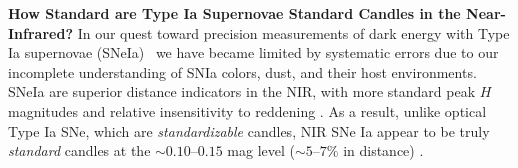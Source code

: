 \documentclass[11pt]{article}
\begin{document}
%

%
%
%

\sciencejustification
{\bf How Standard are Type Ia Supernovae Standard Candles in the Near-Infrared?} 
In our quest toward precision measurements of dark energy with Type Ia supernovae (SNeIa)~\cite{astier06,wood-vasey07,kowalski08,hicken09b,kessler09,conley11,betoule14} we have became limited by 
systematic errors due to our incomplete understanding of SNIa colors, dust, and 
their host environments.
SNeIa are superior distance
indicators in the NIR, with more standard peak $H$ magnitudes and
relative insensitivity to reddening
\cite{meikle00,krisciunas04a,krisciunas07}. 
As a result, unlike optical Type Ia SNe, which are {\em standardizable} candles,
 NIR SNe Ia
appear to be truly {\em standard} candles at the $\sim0.10$--$0.15$ mag
level ($\sim5$--$7\%$ in distance)
\cite{krisciunas04a,krisciunas05a,wood-vasey08,folatelli10,weyant11,barone-nugent12,kattner12}.
\end{document}
